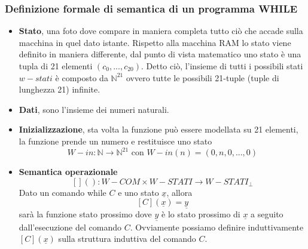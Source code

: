 \documentclass{article}
\begin{document}
\subsubsection{Definizione formale di semantica di un programma WHILE}
\begin{itemize}
    \item \textbf{Stato}, una foto dove compare in maniera completa tutto ciò che accade sulla macchina in quel dato istante.
          Rispetto alla macchina RAM lo stato viene definito in maniera differente, dal punto di vista matematico uno stato è
          una tupla di 21 elementi $(c_0, ..., c_{20})$. Detto ciò, l'insieme di tutti i possibili stati $w-stati$ è composto
          da $\mathbb{N}^{21}$ ovvero tutte le possibili 21-tuple (tuple di lunghezza 21) infinite.

    \item \textbf{Dati}, sono l'insieme dei numeri naturali.
    \item \textbf{Inizializzazione}, sta volta la funzione può essere modellata su 21 elementi, la funzione prende un
          numero e restituisce uno stato
          $$W-in:\mathbb{N}\rightarrow\mathbb{N}^{21}\text{ con }W-in(n)=(0,n,0,...,0)$$
    \item \textbf{Semantica operazionale}
          $$[]():W-COM\times W-STATI\rightarrow W-STATI_\bot$$
          Dato un comando while $C$ e uno stato $\underline{x}$, allora
          $$[C](\underline{x})=\underline{y}$$
          sarà la funzione stato prossimo dove $\underline{y}$ è lo stato prossimo di $\underline{x}$ a seguito
          dall'esecuzione del comando $C$.
          Ovviamente possiamo definire induttivamente $[C](\underline{x})$ sulla struttura induttiva
          del comando $C$.
\end{itemize}
\end{document}
